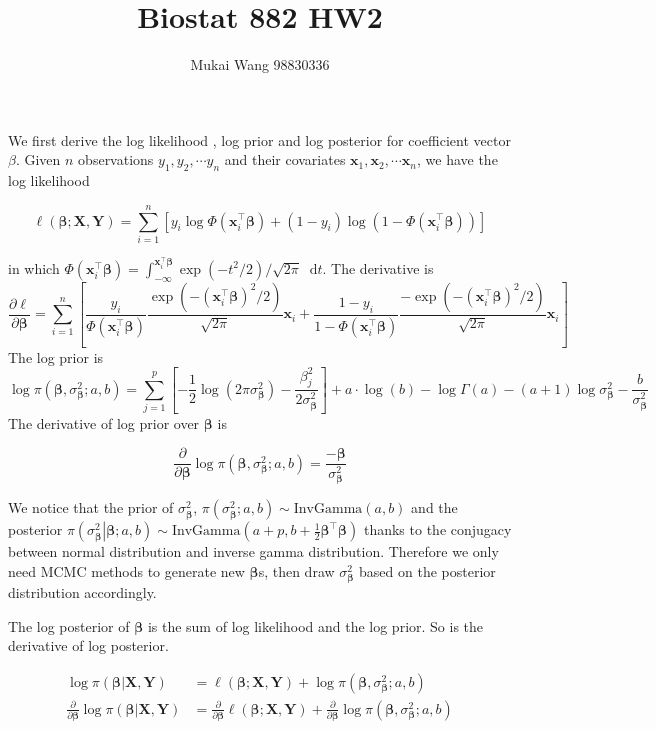 \documentclass[12pt]{article}
\title{Biostat 882 HW2}
\date{}
\author{Mukai Wang 98830336}
\newcommand*\diff{\mathop{}\!\mathrm{d}}
\begin{document}
\maketitle

We first derive the log likelihood , log prior and log posterior for coefficient vector $\beta$. Given $n$ observations $y_1, y_2, \cdots y_n$ and their covariates $\bm{x}_1, \bm{x}_2, \cdots \bm{x}_n$, we have the log likelihood

\[ \ell(\bm{\beta}; \bm{X}, \bm{Y}) = \sum_{i=1}^{n} \left[ y_i \log \Phi(\bm{x}_i^\top \bm{\beta}) + (1-y_i) \log \left(1 - \Phi(\bm{x}_i^\top \bm{\beta})\right)\right] \]

 in which $\Phi(\bm{x}_i^\top \bm{\beta}) = \int_{-\infty}^{\bm{x}_i^\top \bm{\beta}} \exp \left(-t^2 / 2 \right) / \sqrt{2\pi} \diff t$. The derivative is 
 \[\frac{\partial \ell}{\partial \bm{\beta}} = \sum_{i=1}^{n} \left[ \frac{y_i}{\Phi(\bm{x}_i^\top \bm{\beta})} \frac{\exp (-(\bm{x}_i^\top \bm{\beta})^2 / 2)}{\sqrt{2\pi}}\bm{x}_i + \frac{1-y_i}{1-\Phi(\bm{x}_i^\top \bm{\beta})} \frac{-\exp (-(\bm{x}_i^\top \bm{\beta})^2 / 2)}{\sqrt{2\pi}} \bm{x}_i \right] \]
The log prior is
\[ \log \pi(\bm{\beta}, \sigma^2_{\bm{\beta}}; a,b) = \sum_{j=1}^{p}\left[-\frac{1}{2}\log(2\pi\sigma^2_{\bm{\beta}}) - \frac{\beta^2_j}{2\sigma^2_{\bm{\beta}} } \right] + a\cdot \log(b) - \log\Gamma(a) - (a+1)\log \sigma^2_{\bm{\beta}} - \frac{b}{\sigma^2_{\bm{\beta}}} \]
The derivative of log prior over $\bm{\beta}$ is

\[ \frac{\partial}{\partial \bm{\beta}}\log \pi(\bm{\beta}, \sigma^2_{\bm{\beta}}; a,b) = \frac{-\bm{\beta}}{\sigma^2_{\bm{\beta}}} \]

We notice that the prior of $\sigma^2_{\bm{\beta}}$,  $\pi\left(\sigma^2_{\bm{\beta}}; a,b\right) \sim \text{InvGamma}(a, b)$ and the posterior $\pi\left(\left. \sigma^2_{\bm{\beta}}\right\vert \bm{\beta}; a,b\right) \sim \text{InvGamma}\left(a+p, b+\frac{1}{2}\bm{\beta}^\top \bm{\beta}\right)$ thanks to the conjugacy between normal distribution and inverse gamma distribution. Therefore we only need MCMC methods to generate new $\bm{\beta}$s, then draw $\sigma^2_{\bm{\beta}}$ based on the posterior distribution accordingly.

The log posterior of $\bm{\beta}$ is the sum of log likelihood and the log prior. So is the derivative of log posterior.


\begin{align*}
	\log \pi \left(\left.\bm{\beta} \right\vert  \bm{X}, \bm{Y} \right)&=  \ell(\bm{\beta}; \bm{X}, \bm{Y}) + \log \pi(\bm{\beta}, \sigma^2_{\bm{\beta}}; a,b) \\
	\frac{\partial}{\partial \bm{\beta}} \log \pi \left(\left.\bm{\beta} \right\vert  \bm{X}, \bm{Y} \right) &=  \frac{\partial}{\partial \bm{\beta}}\ell(\bm{\beta}; \bm{X}, \bm{Y}) + \frac{\partial}{\partial \bm{\beta}}\log \pi(\bm{\beta}, \sigma^2_{\bm{\beta}}; a,b)
\end{align*}
\end{document}
